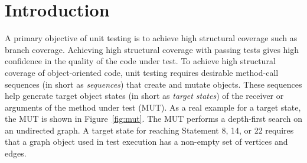 \section{Introduction}
\label{sec:intro}

A primary objective of unit testing is to achieve high structural coverage such as branch coverage. Achieving high structural coverage with passing tests gives high confidence in the quality of the code under test. To achieve high structural coverage of object-oriented code, unit testing requires desirable method-call sequences (in short as \emph{sequences})  that create and mutate objects. These sequences help generate target object states (in short as \emph{target states}) of the receiver or arguments of the method under test (MUT). As a real example for a target state, the  MUT is shown in Figure~\ref{fig:mut}. The MUT performs a depth-first search on an undirected graph. A target state for reaching Statement 8, 14, or 22 requires that a graph object used in test execution has a non-empty set of vertices and edges. 

